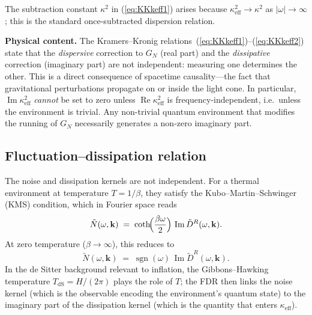 \documentclass[12pt,a4paper]{article}
\begin{document}
\noindent
The subtraction constant $\kappa^{2}$ in (\ref{eq:KKkeff1}) arises because $\kappa_{\mathrm{eff}}^{2}\to\kappa^{2}$ as $|\omega|\to\infty$; this is the standard once-subtracted dispersion relation.

\medskip

\noindent
\textbf{Physical content.}
The Kramers--Kronig relations~(\ref{eq:KKkeff1})--(\ref{eq:KKkeff2}) state that the \emph{dispersive} correction to $G_{N}$ (real part) and the \emph{dissipative} correction (imaginary part) are not independent: measuring one determines the other.
This is a direct consequence of spacetime causality---the fact that gravitational perturbations propagate on or inside the light cone.
In particular, $\operatorname{Im}\kappa_{\mathrm{eff}}^{2}$ \emph{cannot} be set to zero unless $\operatorname{Re}\kappa_{\mathrm{eff}}^{2}$ is frequency-independent, i.e.\ unless the environment is trivial.
Any non-trivial quantum environment that modifies the running of $G_{N}$ necessarily generates a non-zero imaginary part.

\subsection{Fluctuation--dissipation relation}\label{sec:FDR}

The noise and dissipation kernels are not independent.
For a thermal environment at temperature $T=1/\beta$, they satisfy the Kubo--Martin--Schwinger (KMS) condition, which in Fourier space reads \cite{HuVerdaguer2008}
\begin{equation}\label{eq:FDR}
  \tilde{N}(\omega,\mathbf{k})
  \;=\;
  \coth\!\Bigl(\frac{\beta\omega}{2}\Bigr)\,\operatorname{Im}\tilde{D}^{R}(\omega,\mathbf{k}).
\end{equation}
At zero temperature ($\beta\to\infty$), this reduces to
\begin{equation}\label{eq:FDR0}
  \tilde{N}(\omega,\mathbf{k})
  \;=\;
  \operatorname{sgn}(\omega)\,\operatorname{Im}\tilde{D}^{R}(\omega,\mathbf{k}).
\end{equation}
In the de Sitter background relevant to inflation, the Gibbons--Hawking temperature $T_{\mathrm{dS}}=H/(2\pi)$ plays the role of $T$; the FDR then links the noise kernel (which is the observable encoding the environment's quantum state) to the imaginary part of the dissipation kernel (which is the quantity that enters $\kappa_{\mathrm{eff}}$).
\end{document}
